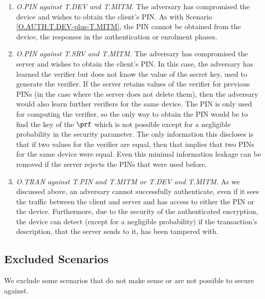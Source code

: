 \begin{enumerate}
\item\textit{O.PIN against T.DEV and  T.MITM.}
The adversary has compromised the device and wishes to obtain the client's PIN. As with Scenario \ref{O.AUTH:T.DEV-plus-T.MITM}, the PIN cannot be obtained from the device, the responses in the authentication or enrolment phases.

\item\textit{O.PIN against T.SRV and T.MITM.}
\label{sec:servercompromise}
The adversary has compromised the server and wishes to obtain the client's PIN.
In this case, the adversary has learned the verifier but does not know the value of the secret key, used to generate the verifier. If the server retains values of the verifier for previous PINs (in the case where the server does not delete them), then the adversary would also learn further verifiers for the same device. The PIN is only used for computing the verifier, so the only way to obtain the PIN would be to find the key of the $\prf$ which is not possible except for a negligible probability in the security parameter. The only information this discloses is that if two values for the verifier are equal, then that implies that two PINs for the same device were equal. Even this minimal information leakage can be removed if the server rejects the PINs that were used before. 

\item\textit{O.TRAN against T.PIN and T.MITM or T.DEV and T.MITM.} As we discussed above, an adversary cannot successfully authenticate, even if it sees the traffic between the client and server and has access to either the PIN or the device. Furthermore, due to the security of the authenticated encryption, the device can detect (except for a negligible probability) if the transaction's description, that the server sends to it, has been tampered with. 
 
\end{enumerate}


\subsection{Excluded Scenarios}

We exclude some scenarios that do not make sense or are not possible to secure against.

